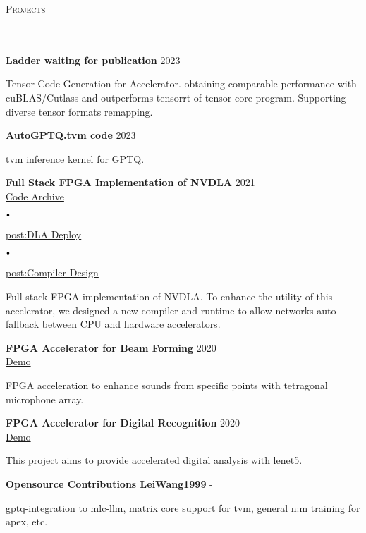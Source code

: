 \documentclass{article}
\newcommand{\header}[1]{{
\hspace*{-15pt}\vspace*{6pt} \textsc{#1}} \vspace*{-6pt} 
\lineunder
}
\newcommand{\lineunder}{
\vspace*{-8pt} \\ \hspace*{-18pt} 
\hrulefill \\
}
\newcommand{\project}[3]{{
\vspace*{2pt}%
\textbf{#1} \hfill #2\\ #3 \vspace*{2pt}}
}
\renewcommand{\labelitemi}{
$\vcenter{\hbox{\tiny$\bullet$}}$\hspace*{3pt}
}
\renewcommand{\labelitemii}{
$\vcenter{\hbox{\tiny$\bullet$}}$\hspace*{-3pt}
}
\newcommand{\myhref}[2]{%
\href{#1}{\textcolor{ColorTwo}{#2}}
}
\newenvironment{bullet-list-minor}{
\begin{list}{\labelitemii}{\setlength\leftmargin{15pt} 
\topsep 0pt \itemsep -2pt}}{\vspace*{4pt}\end{list}
}
\begin{document}
\vspace*{4pt}%
\header{Projects}
    \project{Ladder \textcolor{ColorOne}
{waiting for publication}}{2023}{}
    \begin{bullet-list-minor}
	\item Tensor Code Generation for Accelerator. obtaining comparable performance with cuBLAS/Cutlass and outperforms tensorrt of tensor core program. Supporting diverse tensor formats remapping.
    \end{bullet-list-minor}
    \project{AutoGPTQ.tvm     \textcolor{ColorTwo}{\faGithub} 
\myhref{https://github.com/LeiWang1999/AutoGPTQ.tvm}{code}}{2023}{}
    \begin{bullet-list-minor}
	\item tvm inference kernel for GPTQ.
    \end{bullet-list-minor}
    \project{Full Stack FPGA Implementation of NVDLA}{2021}{
    \textcolor{ColorTwo}{\faGithub} 
\myhref{https://github.com/LeiWang1999/ZYNQ-NVDLA}{Code Archive}
    \labelitemi
    \textcolor{ColorTwo}{\faBook} 
\myhref{https://zhuanlan.zhihu.com/p/378202360}{post:DLA Deploy}
    \labelitemi
        \textcolor{ColorTwo}{\faBook} 
    \myhref{https://zhuanlan.zhihu.com/p/401943271}{post:Compiler Design}
}
	\begin{bullet-list-minor}
	\item Full-stack FPGA implementation of NVDLA. To enhance the utility of this accelerator, we designed a new compiler and runtime to allow networks auto fallback between CPU and hardware
                accelerators.
    \end{bullet-list-minor}
    \project{FPGA Accelerator for Beam Forming}{2020}{
    \textcolor{ColorTwo}{\faVideoCamera} 
    \myhref{https://github.com/LeiWang1999}{Demo}
}
	\begin{bullet-list-minor}
	\item FPGA acceleration to enhance sounds from specific points with tetragonal microphone array.
    \end{bullet-list-minor}
    \project{FPGA Accelerator for Digital Recognition}{2020}{
    \textcolor{ColorTwo}{\faVideoCamera} 
    \myhref{https://github.com/LeiWang1999}{Demo}
}
	\begin{bullet-list-minor}
	\item This project aims to provide accelerated digital analysis with lenet5.
    \end{bullet-list-minor}
    \project{Opensource Contributions     \textcolor{ColorTwo}{\faGithub} 
    \myhref{https://github.com/LeiWang1999}{LeiWang1999}}{-}{
}
	\begin{bullet-list-minor}
	\item gptq-integration to mlc-llm, matrix core support for tvm, general n:m training for apex, etc.
    \end{bullet-list-minor}
 
\end{document}
